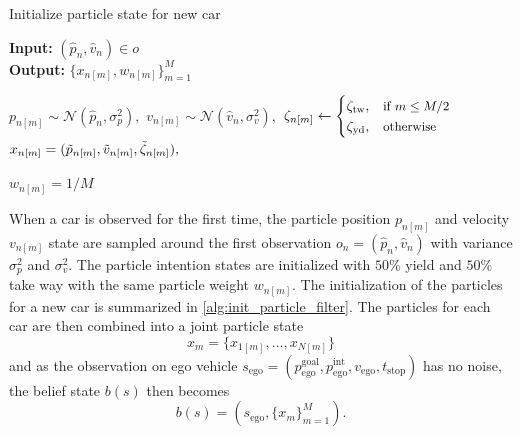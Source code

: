 
\begin{algorithm}[t]
    \caption{Initialize particle state for new car }\label{alg:init_particle_filter}
    \hspace*{\algorithmicindent} \textbf{Input:} $(\hat{p}_{n} , \hat{v}_{n} ) \in o$ \\
    \hspace*{\algorithmicindent} \textbf{Output:} $\{x_{n[m]},w_{n[m]}\}^M_{m=1}$ 
   
    \begin{algorithmic}[1]
        \State $p_{n[m]} \sim \mathcal{N}(\hat{p}_{n}, \sigma_p^2),$
        \State $v_{n[m]} \sim \mathcal{N}(\hat{v}_{n}, \sigma_v^2),$
        \State $\zeta_{n[m]} \gets \begin{cases}
                            \zeta_\mathrm{tw}, & \text{\small if $m \leq M/2$}\\
                            \zeta_\mathrm{yd}, & \text{\small otherwise}
                        \end{cases}$
        \State $x_{n[m]} = (\Tilde{p}_{n[m]}, \Tilde{v}_{n[m]}, \Tilde{\zeta}_{n[m]}),$
        
        \State $w_{n[m]}=1/M$
    \EndFor

    \end{algorithmic}
\end{algorithm}
When a car is observed for the first time, the particle position $p_{n[m]}$ and velocity $v_{n[m]}$ state are sampled around the first observation $o_n = (\hat{p}_{n}, \hat{v}_{n} )$ with variance $\sigma_p^2$ and $\sigma_v^2$. The particle intention states are initialized with $50\%$ yield and $50\%$ take way with the same particle weight $w_{n[m]}$. The initialization of the particles for a new car is summarized in \ref{alg:init_particle_filter}. 
The particles for each car are then combined into a joint particle state 
\begin{equation}
    x_{m} = \{x_{1[m]}, \dots, x_{N[m]}\}
    \label{eq:joint_particles}
\end{equation}
and as the observation on ego vehicle $s_\mathrm{ego}=(p_\mathrm{ego}^\mathrm{goal},p_\mathrm{ego}^\mathrm{int}, v_\mathrm{ego}, t_\mathrm{stop})$ has no noise, the belief state $b(s)$ then becomes 
\begin{equation}
    b(s) = (s_\mathrm{ego}, \{x_m\}^M_{m=1}).
    \label{eq:particle_belief_state}
\end{equation}

